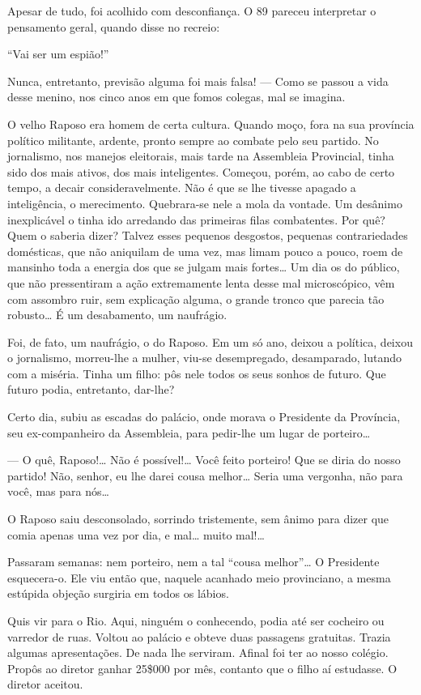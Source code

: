 Apesar de tudo, foi acolhido com desconfiança. O 89 pareceu interpretar
o pensamento geral, quando disse no recreio:

``Vai ser um espião!''

Nunca, entretanto, previsão alguma foi mais falsa! --- Como se passou a
vida desse menino, nos cinco anos em que fomos colegas, mal se imagina.

O velho Raposo era homem de certa cultura. Quando moço, fora na sua
província político militante, ardente, pronto sempre ao combate pelo seu
partido. No jornalismo, nos manejos eleitorais, mais tarde na Assembleia
Provincial, tinha sido dos mais ativos, dos mais inteligentes. Começou,
porém, ao cabo de certo tempo, a decair consideravelmente. Não é que se
lhe tivesse apagado a inteligência, o merecimento. Quebrara-se nele a
mola da vontade. Um desânimo inexplicável o tinha ido arredando das
primeiras filas combatentes. Por quê? Quem o saberia dizer? Talvez esses
pequenos desgostos, pequenas contrariedades domésticas, que não
aniquilam de uma vez, mas limam pouco a pouco, roem de mansinho toda a
energia dos que se julgam mais fortes\ldots{} Um dia os do público, que não
pressentiram a ação extremamente lenta desse mal microscópico, vêm com
assombro ruir, sem explicação alguma, o grande tronco que parecia tão
robusto\ldots{} É um desabamento, um naufrágio.

Foi, de fato, um naufrágio, o do Raposo. Em um só ano, deixou a
política, deixou o jornalismo, morreu-lhe a mulher, viu-se desempregado,
desamparado, lutando com a miséria. Tinha um filho: pôs nele todos os
seus sonhos de futuro. Que futuro podia, entretanto, dar-lhe?

Certo dia, subiu as escadas do palácio, onde morava o Presidente da
Província, seu ex-companheiro da Assembleia, para pedir-lhe um lugar de
porteiro\ldots{}

--- O quê, Raposo!\ldots{} Não é possível!\ldots{} Você feito porteiro! Que se
diria do nosso partido! Não, senhor, eu lhe darei cousa melhor\ldots{} Seria
uma vergonha, não para você, mas para nós\ldots{}

O Raposo saiu desconsolado, sorrindo tristemente, sem ânimo para dizer
que comia apenas uma vez por dia, e mal\ldots{} muito mal!\ldots{}

Passaram semanas: nem porteiro, nem a tal ``cousa melhor''\ldots{} O
Presidente esquecera-o. Ele viu então que, naquele acanhado meio
provinciano, a mesma estúpida objeção surgiria em todos os lábios.

Quis vir para o Rio. Aqui, ninguém o conhecendo, podia até ser cocheiro
ou varredor de ruas. Voltou ao palácio e obteve duas passagens
gratuitas. Trazia algumas apresentações. De nada lhe serviram. Afinal
foi ter ao nosso colégio. Propôs ao diretor ganhar 25\$000 por mês,
contanto que o filho aí estudasse. O diretor aceitou.

